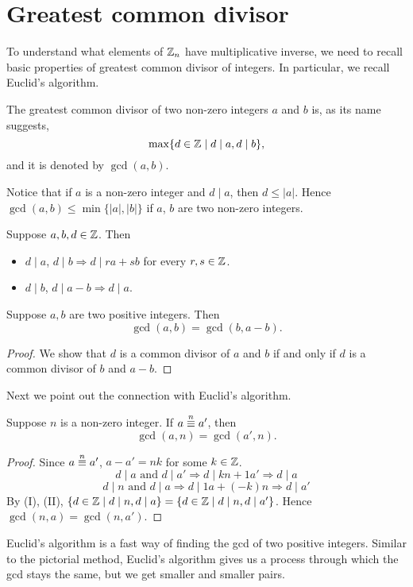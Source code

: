 \section{Greatest common divisor}

To understand what elements of $\mathbb{Z}_n$ have multiplicative
inverse, we need to recall basic properties of greatest common
divisor of integers. In particular, we recall Euclid's
algorithm.

The greatest common divisor of two non-zero integers $a$
and $b$ is, as its name suggests,
\[\max\{d\in\mathbb{Z}\mid d\mid a,d\mid b\},\]
and it is denoted by $\gcd(a,b)$.

Notice that if $a$ is a non-zero integer and $d\mid a$,
then $d\leq |a|$. Hence $\gcd(a,b)\leq\min\{|a|,|b|\}$
if $a$, $b$ are two non-zero integers.

\begin{lemma}
    Suppose $a,b,d\in\mathbb{Z}$. Then
    \begin{itemize}
        \item $d\mid a$, $d\mid b\Longrightarrow d\mid ra+sb$ for every $r,s\in\mathbb{Z}$.
        \item $d\mid b$, $d\mid a-b\Longrightarrow d\mid a$.
    \end{itemize}
\end{lemma}

\begin{corollary}
    Suppose $a,b$ are two positive integers. Then
    \[\gcd(a,b)=\gcd(b,a-b).\]
\end{corollary}

\begin{proof}
    We show that $d$ is a common divisor of $a$ and $b$
    if and only if $d$ is a common divisor of $b$ and $a-b$.
\end{proof}

Next we point out the connection with Euclid's algorithm.

\begin{lemma}
    Suppose $n$ is a non-zero integer. If $a\overset{n}{\equiv} a'$, then
    \[\gcd(a,n)=\gcd(a',n).\]
\end{lemma}

\begin{proof}
    Since $a\overset{n}{\equiv} a'$, $a-a'=nk$ for some $k\in\mathbb{Z}$.
    \begin{equation}
        d\mid a\text{ and }d\mid a'\Rightarrow d\mid kn+1a'\Rightarrow d\mid a\tag{I}
    \end{equation}
    \begin{equation}
        d\mid n\text{ and }d\mid a\Rightarrow d\mid 1a+(-k)n\Rightarrow d\mid a'\tag{II}
    \end{equation}
    By (I), (II), $\{d\in\mathbb{Z}\mid d\mid n,d\mid a\}=\{d\in\mathbb{Z}\mid d\mid n,d\mid a'\}$.
    Hence $\gcd(n,a)=\gcd(n,a')$.
\end{proof}
Euclid's algorithm is a fast way of finding the gcd of two
positive integers. Similar to the pictorial method,
Euclid's algorithm gives us a process through which the gcd 
stays the same, but we get smaller and smaller pairs.

